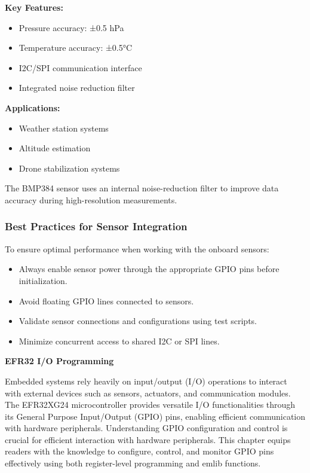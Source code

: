 \documentclass[
  9pt,
  letterpaper,
  abstract,
  titlepage]{scrbook}
\makeatletter
\renewcommand\chapter{\clearpage\global\@topnum\z@
\@afterindentfalse \secdef\@chapter\@schapter}
\newif\if@firstnumbered%
\newif\if@firstunnumbered%
\newcounter{lastRomanPage}
\let\old@chapter\chapter%
\renewcommand{\chapter}{%
  \@ifstar{\unnumbered@chapter}{\numbered@chapter}%
}
\newcommand{\numbered@chapter}[1]{%
  \if@firstnumbered%
    \cleardoublepage%
    \setcounter{lastRomanPage}{\value{page}}%
    \pagenumbering{arabic}%
    \@firstnumberedfalse%
  \else
    \setcounter{page}{\value{page}}%
  \fi
  \old@chapter{#1}%
}
\newcommand{\unnumbered@chapter}[1]{%
  \if@firstunnumbered%
    \clearpage
    \setcounter{lastRomanPage}{\value{page}}%
    \pagenumbering{roman}%
    \@firstunnumberedfalse%
  \fi
  \old@chapter*{#1}%
}
\makeatother
\begin{document}
\textbf{Key Features:}

\begin{itemize}
\item
  Pressure accuracy: ±0.5 hPa
\item
  Temperature accuracy: ±0.5°C
\item
  I2C/SPI communication interface
\item
  Integrated noise reduction filter
\end{itemize}

\textbf{Applications:}

\begin{itemize}
\item
  Weather station systems
\item
  Altitude estimation
\item
  Drone stabilization systems
\end{itemize}

The BMP384 sensor uses an internal noise-reduction filter to improve
data accuracy during high-resolution measurements.

\subsubsection{Best Practices for Sensor
Integration}\label{best-practices-for-sensor-integration}

To ensure optimal performance when working with the onboard sensors:

\begin{itemize}
\item
  Always enable sensor power through the appropriate GPIO pins before
  initialization.
\item
  Avoid floating GPIO lines connected to sensors.
\item
  Validate sensor connections and configurations using test scripts.
\item
  Minimize concurrent access to shared I2C or SPI lines.
\end{itemize}

\chapter{\texorpdfstring{\textbf{EFR32 I/O
Programming}}{EFR32 I/O Programming}}\label{efr32-io-programming}

Embedded systems rely heavily on input/output (I/O) operations to
interact with external devices such as sensors, actuators, and
communication modules. The EFR32XG24 microcontroller provides versatile
I/O functionalities through its General Purpose Input/Output (GPIO)
pins, enabling efficient communication with hardware peripherals.
Understanding GPIO configuration and control is crucial for efficient
interaction with hardware peripherals. This chapter equips readers with
the knowledge to configure, control, and monitor GPIO pins effectively
using both register-level programming and emlib functions.
\end{document}
